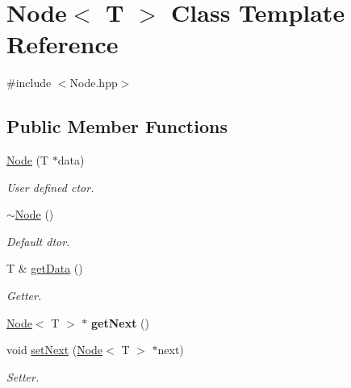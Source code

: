 \hypertarget{class_node}{}\section{Node$<$ T $>$ Class Template Reference}
\label{class_node}


{\ttfamily \#include $<$Node.\+hpp$>$}

\subsection*{Public Member Functions}
\begin{DoxyCompactItemize}
\item 
\mbox{\label{class_node_abf430c25b3ae341edd7e283d77f8497a}} 
\mbox{\hyperlink{class_node_abf430c25b3ae341edd7e283d77f8497a}{Node}} (T $\ast$data)
\begin{DoxyCompactList}\small\item\em User defined ctor. \end{DoxyCompactList}\item 
\mbox{\label{class_node_ae923d0417581dd19784d55b901f0f7f0}} 
\mbox{\hyperlink{class_node_ae923d0417581dd19784d55b901f0f7f0}{$\sim$\+Node}} ()
\begin{DoxyCompactList}\small\item\em Default dtor. \end{DoxyCompactList}\item 
\mbox{\label{class_node_aadb11c8a45c32f0d23a3ff8062668319}} 
T \& \mbox{\hyperlink{class_node_aadb11c8a45c32f0d23a3ff8062668319}{get\+Data}} ()
\begin{DoxyCompactList}\small\item\em Getter. \end{DoxyCompactList}\item 
\mbox{\label{class_node_afd985b504e37f4f8d7342f58e6035238}} 
\mbox{\hyperlink{class_node}{Node}}$<$ T $>$ $\ast$ {\bfseries get\+Next} ()
\item 
\mbox{\label{class_node_a486348d99412bba1c889db7dd63ca8cb}} 
void \mbox{\hyperlink{class_node_a486348d99412bba1c889db7dd63ca8cb}{set\+Next}} (\mbox{\hyperlink{class_node}{Node}}$<$ T $>$ $\ast$next)
\begin{DoxyCompactList}\small\item\em Setter. \end{DoxyCompactList}\end{DoxyCompactItemize}


